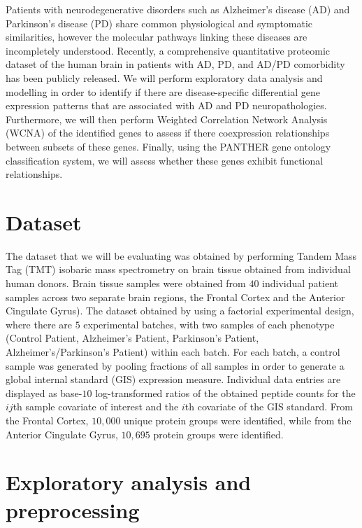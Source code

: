 Patients with neurodegenerative disorders such as Alzheimer’s disease (AD) and Parkinson’s disease (PD) share common physiological and symptomatic similarities, however the molecular pathways linking these diseases are incompletely understood. Recently, a comprehensive quantitative proteomic dataset of the human brain in patients with AD, PD, and AD/PD comorbidity has been publicly released. We will perform exploratory data analysis and modelling in order to identify if there are disease-specific differential gene expression patterns that are associated with AD and PD neuropathologies. Furthermore, we will then perform Weighted Correlation Network Analysis (WCNA) of the identified genes to assess if there coexpression relationships between subsets of these genes. Finally, using the PANTHER gene ontology classification system, we will assess whether these genes exhibit functional relationships. 



\section{Dataset}
\label{sec:dataset}

The dataset\cite{proteome} that we will be evaluating was obtained by performing Tandem Mass Tag (TMT) isobaric mass spectrometry on brain tissue obtained from individual human donors. Brain tissue samples were obtained from $40$ individual patient samples across two separate brain regions, the Frontal Cortex and the Anterior Cingulate Gyrus). The dataset obtained by using a factorial experimental design, where there are $5$ experimental batches, with two samples of each phenotype (Control Patient, Alzheimer’s Patient, Parkinson’s Patient, Alzheimer’s/Parkinson’s Patient) within each batch. For each batch, a control sample was generated by pooling fractions of all samples in order to generate a global internal standard (GIS) expression measure. Individual data entries are displayed as base-$10$ log-transformed ratios of the obtained peptide counts for the $ij$th sample covariate of interest and the $i$th covariate of the GIS standard. From the Frontal Cortex, $10,000$ unique protein groups were identified, while from the Anterior Cingulate Gyrus, $10,695$ protein groups were identified.

\section{Exploratory analysis and preprocessing}
\label{sec:expl-analys-prepr}

